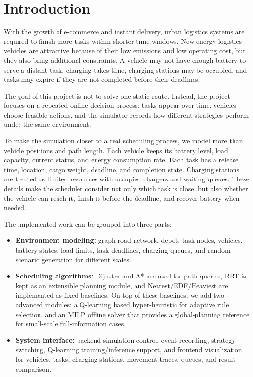 \section{Introduction}
\label{sec:intro}

With the growth of e-commerce and instant delivery, urban logistics systems are required to finish more tasks within shorter time windows. New energy logistics vehicles are attractive because of their low emissions and low operating cost, but they also bring additional constraints. A vehicle may not have enough battery to serve a distant task, charging takes time, charging stations may be occupied, and tasks may expire if they are not completed before their deadlines.

The goal of this project is not to solve one static route. Instead, the project focuses on a repeated online decision process: tasks appear over time, vehicles choose feasible actions, and the simulator records how different strategies perform under the same environment.

To make the simulation closer to a real scheduling process, we model more than vehicle positions and path length. Each vehicle keeps its battery level, load capacity, current status, and energy consumption rate. Each task has a release time, location, cargo weight, deadline, and completion state. Charging stations are treated as limited resources with occupied chargers and waiting queues. These details make the scheduler consider not only which task is close, but also whether the vehicle can reach it, finish it before the deadline, and recover battery when needed.

The implemented work can be grouped into three parts:
\begin{itemize}
    \item \textbf{Environment modeling:} graph road network, depot, task nodes, vehicles, battery states, load limits, task deadlines, charging queues, and random scenario generation for different scales.
    \item \textbf{Scheduling algorithms:} Dijkstra and A* are used for path queries, RRT is kept as an extensible planning module, and Nearest/EDF/Heaviest are implemented as fixed baselines. On top of these baselines, we add two advanced modules: a Q-learning based hyper-heuristic for adaptive rule selection, and an MILP offline solver that provides a global-planning reference for small-scale full-information cases.
    \item \textbf{System interface:} backend simulation control, event recording, strategy switching, Q-learning training/inference support, and frontend visualization for vehicles, tasks, charging stations, movement traces, queues, and result comparison.
\end{itemize}
